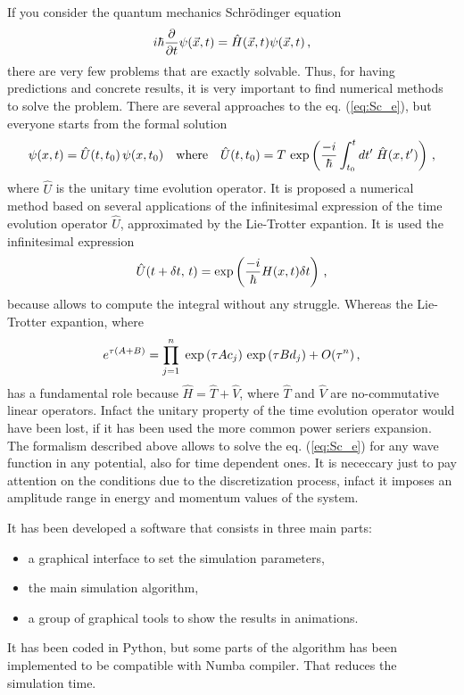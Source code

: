 \documentclass{article}
\begin{document}
If you consider the quantum mechanics Schr\"odinger equation 
\begin{equation}
    \centering
    i \hbar \frac{\partial}{\partial t} \psi (\vec{x}, t) = \hat{H} (\vec{x}, t) \psi (\vec{x}, t) \, \text{,}
    \label{eq:Sc_e}
\end{equation}
there are very few problems that are exactly solvable. Thus, for having predictions and concrete results, it is very important to find numerical methods to solve the problem.
There are several approaches to the eq. (\ref{eq:Sc_e}), but everyone starts from the formal solution 
\begin{equation}
    \centering
    \psi (x,t) = \hat{U}(t, t_{0}) \, \psi (x, t_0)  \quad \text{where} \quad \hat{U}(t, t_{0}) = T  \, \exp \left(\frac{-i}{\hbar} \int _{t_{0}} ^{t} dt' \; \hat{H}(x,t') \right) \, \text{,}
    \label{eq:U_e}
\end{equation}
where $\hat{U}$ is the unitary time evolution operator.
It is proposed a numerical method based on several applications of the infinitesimal expression of the time evolution operator $\hat{U}$, approximated by the Lie-Trotter expantion.
It is used the infinitesimal expression
\begin{equation}
    \centering
    \hat{U}(t + \delta t, \, t) = \exp \left(\frac{-i}{\hbar} {H}(x,t) \delta t \right) \, \text{,}
    \label{eq:U_inf_e}
\end{equation}
because allows to compute the integral without any struggle. 
Whereas the Lie-Trotter expantion, where
\begin{equation}
    \centering
    e^{\tau ({A} + {B})}
    = \prod _{j=1} ^{n} \; \exp \left( \tau A c_{j}\right)  \, \exp \left(\tau B d_{j}\right) + O(\tau^{n}) \, \text{,}
    \label{eq:LT_expantion_e}
\end{equation}
has a fundamental role because $\hat{H} = \hat{T} + \hat{V}$, where  $\hat{T}$ and $\hat{V}$ are no-commutative linear operators. Infact the unitary property of the time evolution operator would have been lost, if it has been used the more common power seriers expansion.
The formalism described above allows to solve the eq. (\ref{eq:Sc_e}) for any wave function in any potential, also for time dependent ones. It is nececcary just to pay attention on the conditions due to the discretization process, infact it imposes an amplitude range in energy and momentum values of the system.

It has been developed a software that consists in three main parts:
\begin{itemize} [nolistsep, leftmargin=1.5cm]
    \item a graphical interface to set the simulation parameters,
    \item the main simulation algorithm,
    \item a group of graphical tools to show the results in animations.
\end{itemize}
It has been coded in Python, but some parts of the algorithm has been implemented to be compatible with Numba compiler. That reduces the simulation time.
\end{document}
